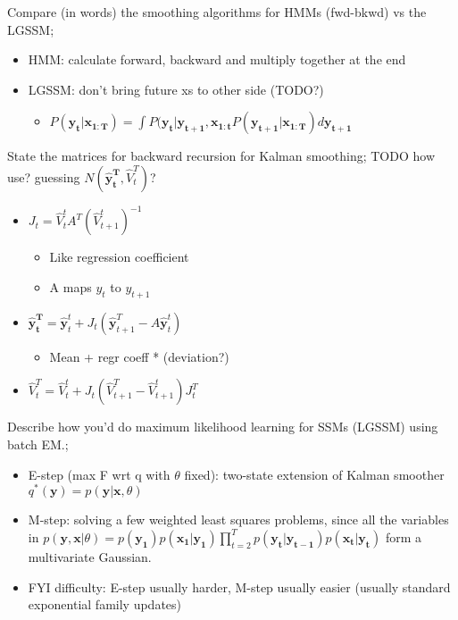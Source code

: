 \documentclass{article}
\begin{document}
Compare (in words) the smoothing algorithms for HMMs (fwd-bkwd) vs the LGSSM; \begin{itemize}
    \item HMM: calculate forward, backward and multiply together at the end
    \item LGSSM: don't bring future xs to other side (TODO?)
    \begin{itemize}
        \item  $P(\mathbf{y_t|x_{1:T}})=\int P(\mathbf{y_t|y_{t+1},x_{1:t}}P(\mathbf{y_{t+1}|x_{1:T}}) d\mathbf{y_{t+1}}$
    \end{itemize}
\end{itemize}

State the matrices for backward recursion for Kalman smoothing; TODO how use? guessing $N(\mathbf{\hat{y}^T_t},\hat{V}^T_t)$? 
\begin{itemize}
    \item $J_t=\hat{V}^t_tA^T(\hat{V}^t_{t+1})^{-1}$
    \begin{itemize}
        \item Like regression coefficient
        \item A maps $y_t$ to $y_{t+1}$
    \end{itemize}
    \item $\mathbf{\hat{y}^T_t}=\hat{\mathbf{y}}^t_t+J_t(\hat{\mathbf{y}}^T_{t+1}-A\hat{\mathbf{y}}^t_t)$
    \begin{itemize}
        \item Mean + regr coeff * (deviation?)
    \end{itemize}
    \item $\hat{V}^T_t=\hat{V}^t_t+J_t(\hat{V}^T_{t+1}-\hat{V}^t_{t+1})J_t^T$
\end{itemize}

Describe how you'd do maximum likelihood learning for SSMs (LGSSM) using batch EM.; \begin{itemize}
    \item E-step (max F wrt q with $\theta$ fixed): two-state extension of Kalman smoother $q^*(\mathbf{y})=p(\mathbf{y|x}, \theta)$
    \item M-step: solving a few weighted least squares problems, since all the variables in $p(\mathbf{y, x}|\theta)=p(\mathbf{y_1})p(\mathbf{x_1|y_1})\prod_{t=2}^Tp(\mathbf{y_t|y_{t-1}})p(\mathbf{x_t|y_t})$ form a multivariate Gaussian.
    \item FYI difficulty: E-step usually harder, M-step usually easier (usually standard exponential family updates)
\end{itemize}
\end{document}
